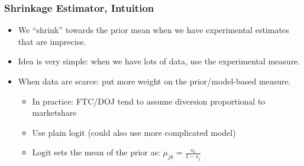\documentclass[aspectratio=169]{beamer}
\begin{document}
\begin{frame}
\frametitle{Shrinkage Estimator, Intuition}
\begin{itemize}
\item We ``shrink'' towards the prior mean when we have experimental estimates that are imprecise.
\item Idea is very simple: when we have lots of data, use the experimental measure.
\item When data are scarce: put more weight on the prior/model-based measure.
\begin{itemize}
\item In practice: FTC/DOJ tend to assume diversion proportional to marketshare
\item Use plain logit (could also use more complicated model)
\item Logit sets the mean of the prior as: $\mu_{jk} = \frac{s_k}{1-s_{j}}$
\end{itemize}
\end{itemize}
\end{frame}
\end{document}
